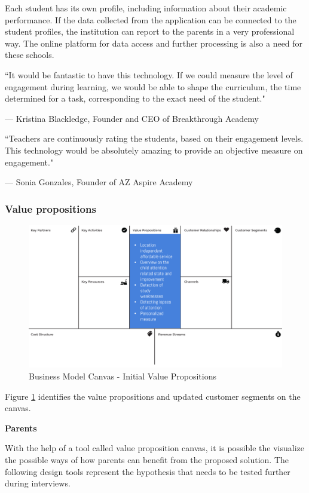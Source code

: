 \documentclass[letterpaper,10pt]{article}
\begin{document}
Each student has its own profile, including information about their academic performance. If the data collected from the application can be connected to the student profiles, the institution can report to the parents in a very professional way. The online platform for data access and further processing is also a need for these schools.


\textcolor{myblue}{\epigraph{``It would be fantastic to have this technology. If we could measure the level of engagement during learning, we would be able to shape the curriculum, the time determined for a task, corresponding to the exact need of the student."}{--- \textup{Kristina Blackledge}, Founder and CEO of Breakthrough Academy}}


\textcolor{myblue}{\epigraph{``Teachers are continuously rating the students, based on their engagement levels. This technology would be absolutely amazing to provide an objective measure on engagement."}{--- \textup{Sonia Gonzales}, Founder of AZ Aspire Academy}}

\subsubsection{Value propositions}


\begin{figure}[!htb]
\centering
\includegraphics[scale=0.5]{valprop.PNG}
\caption{Business Model Canvas - Initial Value Propositions}
\label{img:BMC_vp}
\end{figure}


Figure \ref{img:BMC_vp} identifies the value propositions and updated customer segments on the canvas. 

\textbf{Parents}

With the help of a tool called value proposition canvas, it is possible the visualize the possible ways of how parents can benefit from the proposed solution. The following design tools represent the hypothesis that needs to be tested further during interviews.
\end{document}
